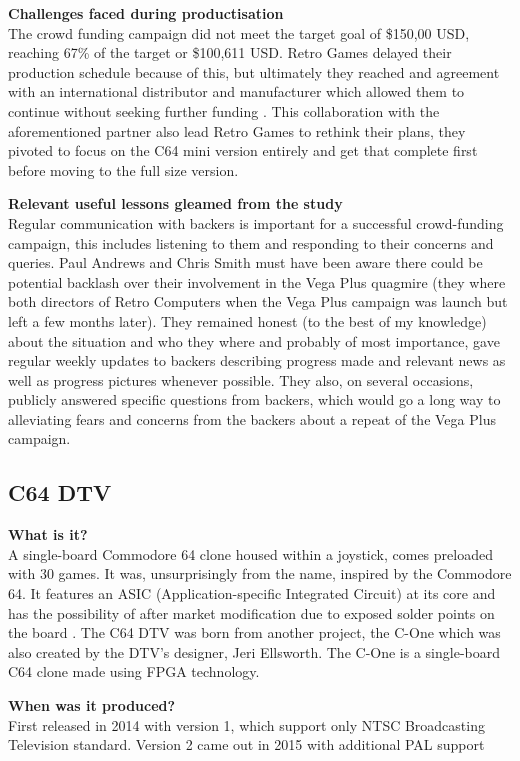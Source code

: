 \textbf{Challenges faced during productisation}\\
The crowd funding campaign did not meet the target goal of \$150,00 USD, reaching 67\% of the target or \$100,611 USD. Retro Games delayed their production schedule because of this, but ultimately they reached and agreement with an international distributor and manufacturer which allowed them to continue without seeking further funding
\cite{RN125}. This collaboration with the aforementioned partner also lead Retro Games to rethink their plans, they pivoted to focus on the C64 mini version entirely and get that complete first before moving to the full size version.

\textbf{Relevant useful lessons gleamed from the study}\\
Regular communication with backers is important for a successful crowd-funding campaign, this includes listening to them and responding to their concerns and queries. Paul Andrews and Chris Smith must have been aware there could be potential backlash over their involvement in the Vega Plus quagmire (they where both directors of Retro Computers when the Vega Plus campaign was launch but left a few months later). They remained honest (to the best of my knowledge) about the situation and who they where and probably of most importance, gave regular weekly updates to backers describing progress made and relevant news as well as progress pictures whenever possible. They also, on several occasions, publicly answered specific questions from backers, which would go a long way to alleviating fears and concerns from the backers about a repeat of the Vega Plus campaign.  


\subsection{C64 DTV}
\textbf{What is it?}\\
A single-board Commodore 64 clone housed within a joystick, comes preloaded with 30 games. It was, unsurprisingly from the name, inspired by the Commodore 64. It features an ASIC (Application-specific Integrated Circuit) at its core 
\cite{RN129} and has the possibility of after market modification due to exposed solder points on the board
\cite{RN126}. The C64 DTV was born from another project, the C-One which was also created by the DTV's designer, Jeri Ellsworth. The C-One is a single-board C64 clone made using FPGA technology.

\textbf{When was it produced?}\\
First released in 2014 with version 1, which support only NTSC Broadcasting Television standard. Version 2 came out in 2015 with additional PAL support


